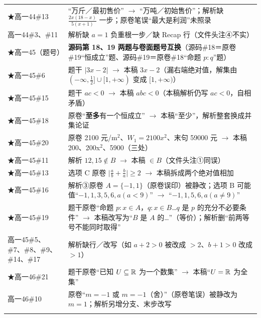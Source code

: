 \documentclass[a4paper,11pt]{article}
\begin{document}
\begin{xltabular}{\textwidth}{@{}>{\raggedright\arraybackslash}p{6.88cm}>{\raggedright\arraybackslash}p{8.28cm}@{}}
★高一44\#13 & ``万斤／最初售价'' $\to$ ``万吨／初始售价''；解析缺 \(\frac{2x(18-x)}{5(x+\allowbreak 1)}\) 一步；原卷笔误``最大是利润''未照录 \\ \addlinespace[1pt]
高一44\#3、\#11 & 解析缺 \(a=\allowbreak 1\) 负重根一步／缺 Recap 行（文件头注④不实） \\ \addlinespace[1pt]
★高一45（题号） & \textbf{源码第 18、19 两题与卷面题号互换}（源码\#18＝原卷\#19``恒成立''题、源码\#19＝原卷\#18``命题 \(p:q\)''题） \\ \addlinespace[1pt]
★高一45\#6 & 题干 \(\lvert3x-2\rvert\) $\to$ 本稿 \(3x-2\)（漏右端绝对值，解集由 \((-\infty,\allowbreak \frac12]\cup\allowbreak [1,\allowbreak +\allowbreak \infty)\) 变成 \([1,\allowbreak +\allowbreak \infty)\)） \\ \addlinespace[1pt]
★高一45\#15 & 题干 \(ac<0\) $\to$ 本稿 \(abc<0\)（本稿解析仍写 \(ac<0\)，自相矛盾） \\ \addlinespace[1pt]
★高一45\#18 & 原卷``\textbf{至多}有一个恒成立'' $\to$ 本稿``至少''，解析整套换成并集论证 \\ \addlinespace[1pt]
★高一45\#20 & 原卷 2100 元/m$^{2}$、\(W_1=\allowbreak 2100x^2\)、末句 59000 元 $\to$ 本稿 200、200x$^{2}$、5900（三处） \\ \addlinespace[1pt]
★高一45\#11 & 解析 \(12,\allowbreak 15\notin B\) $\to$ 本稿 \(\in B\)（文件头注①同误） \\ \addlinespace[1pt]
★高一45\#13 & 选项 C 原卷 \(\lvert\frac ab+\allowbreak \frac ba\rvert\geqslant\allowbreak 2\) $\to$ 本稿拆成两个绝对值相加 \\ \addlinespace[1pt]
★高一45\#16 & 解析③原卷 \(A=\allowbreak \{-1,\allowbreak 1\}\)（原卷误印）被静改；选项 B 可能值``\(-1,\allowbreak 1,\allowbreak 3,\allowbreak 5,\allowbreak 6,a(a<9)\)'' $\to$ ``\(-1,\allowbreak 1,\allowbreak 5,\allowbreak 6,a(a\neq9)\)'' \\ \addlinespace[1pt]
★高一45\#19 & 题干原卷``命题 \(p:x\in A\)，\(q:x\in B\)\ldots{}\(q\) 是 \(p\) 的充分不必要条件'' $\to$ 本稿改写为``\(B\) 是 \(A\) 的\ldots''（等价）；解析删``前两等号不能同时取得'' \\ \addlinespace[1pt]
高一45\#5、\#7、\#8、\#9、\#14、\#17 & 解析缺行／改写（如 \(a+\allowbreak 2>0\) 被改成 \(>2\)、\(b+\allowbreak 1>0\) 改成 \(>1\)） \\ \addlinespace[1pt]
★高一46\#21 & 题干原卷``已知 \(U\subseteq\allowbreak \mathbb{R}\) 为一个数集'' $\to$ 本稿``\(U=\allowbreak \mathbb{R}\) 为全集'' \\ \addlinespace[1pt]
高一46\#10 & 原卷``\(m=\allowbreak -1\) 或 \(m=\allowbreak -1\)（舍）''（原卷笔误）被静改为 \(m=\allowbreak 1\)；解析另增分支、末步改写 \\ \addlinespace[1pt]

\end{xltabular}
\end{document}
